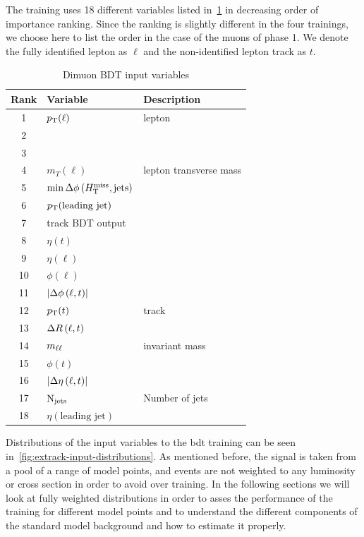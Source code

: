 The training uses 18 different variables listed in~\ref{tab:extrack-bdt-variables} in decreasing order of importance ranking. Since the ranking is slightly different in the four trainings, we choose here to list the order in the case of the muons of phase 1. We denote the fully identified lepton as $\ell$ and the non-identified lepton track as $t$.

\begin{table}[!htb]
	\centering
	\label{tab:extrack-bdt-variables}
		\caption{Dimuon BDT input variables}
			\begin{tabular}{cll} \hline
			Rank & Variable & Description \\ \hline
			1 & $p_{\mathrm{T}}(\ell)$ & lepton \pt\\
			2 & \mht & \\
			3 & \HT & \\
			4 & $m_T(\ell)$ & lepton transverse mass\\			
			5 & $\min{\Delta\phi\left(\ensuremath{H_{\mathrm{T}}^{\text{miss}}},\mathrm{jets}\right)}$ & \\
			6 & $p_{\mathrm{T}}(\text{leading jet})$ & \\		
			7 & track BDT output & \\
			8 & $\eta(t)$ & \\
			9 & $\eta(\ell)$ & \\
			10 & $\phi(\ell)$ & \\
			11 & $\lvert \Delta\phi\left(\ell,t \right) \rvert$ & \\			
			12 & $p_{\mathrm{T}}(t)$ & track \pt\\
			13 & $\Delta R\left(\ell, t\right)$ & \\
			14 & $m_{\ell\ell}$ & invariant mass \\
			15 & $\phi(t)$ & \\
			16 & $\lvert \Delta \eta \left(\ell, t\right)  \rvert$ & \\			
			17 & $\mathrm{N}_{\mathrm{jets}}$ & Number of jets \\ 
			18 & $\eta(\text{leading jet})$ & \\
			\hline
			\end{tabular}
\end{table}

Distributions of the input variables to the \gls{bdt} training can be seen in~\ref{fig:extrack-input-distributions}. As mentioned before, the signal is taken from a pool of a range of model points, and events are not weighted to any luminosity or cross section in order to avoid over training. In the following sections we will look at fully weighted distributions in order to asses the performance of the training for different model points and to understand the different components of the standard model background and how to estimate it properly.

